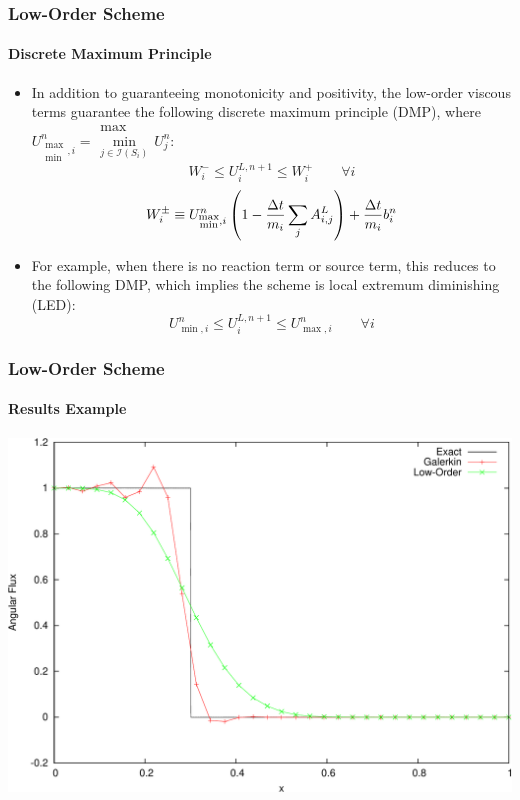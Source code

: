 \documentclass{beamer}
\begin{document}
\begin{frame}
\frametitle{Low-Order Scheme}
\framesubtitle{Discrete Maximum Principle}

\begin{itemize}
   \item In addition to guaranteeing monotonicity and positivity, the low-order
      viscous terms guarantee the following discrete maximum principle (DMP),
      where $U^n_{\substack{\max\\\min},i} =
      \substack{\max\\\min\limits_{j\in\mathcal{I}(S_i)}}U^n_j$:
      \begin{equation}
         W_i^-\leq
         U_i^{L,n+1}\leq
         W_i^+\qquad\forall i
      \end{equation}
      \begin{equation}
         W_i^\pm \equiv U_{\substack{\max\\\min},i}^n\left(1-\frac{\Delta t}{m_i}
         \sum\limits_j A_{i,j}^L\right)
         + \frac{\Delta t}{m_i}b_i^n
      \end{equation}
   \item For example, when there is no reaction term or source term, this reduces
      to the following DMP, which implies the scheme is local extremum
      diminishing (LED):
      \begin{equation}
         U^n_{\min,i}\leq
         U_i^{L,n+1}\leq
         U^n_{\max,i}\qquad\forall i
      \end{equation}
\end{itemize}

\end{frame}
\begin{frame}
\frametitle{Low-Order Scheme}
\framesubtitle{Results Example}

\includegraphics[width=\textwidth]{./figures/advection_low_order.pdf}

\end{frame}
\end{document}
